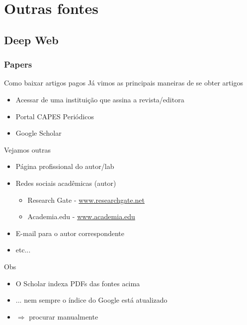 \documentclass{beamer}
\begin{document}
\section{Outras fontes}

\subsection{Deep Web}

\subsubsection{Papers}

\begin{frame}{Como baixar artigos pagos}
Já vimos as principais maneiras de se obter artigos
  \begin{itemize}
    \footnotesize
  \item Acessar de uma instituição que assina a revista/editora
  \item Portal CAPES Periódicos
  \item Google Scholar
  \end{itemize}
\end{frame}

\begin{frame}{Vejamos outras}
  \begin{itemize}
    \footnotesize
  \item Página profissional do autor/lab
  \item Redes sociais acadêmicas (autor)
    \begin{itemize}
    \item Research Gate - \url{www.researchgate.net}
    \item Academia.edu - \url{www.academia.edu}
    \end{itemize}
  \item E-mail para o autor correspondente
  \item etc...
  \end{itemize}
  \begin{block}{Obs}
    \begin{itemize}
    \footnotesize
    \item O Scholar indexa PDFs das fontes acima
    \item ... nem sempre o índice do Google está atualizado
    \item $\Rightarrow$ procurar manualmente
    \end{itemize}
  \end{block}
\end{frame}
\end{document}
